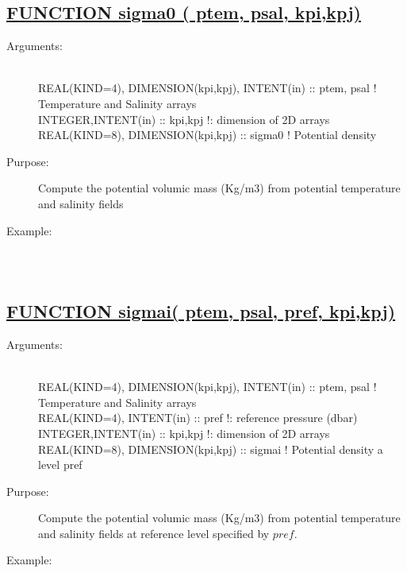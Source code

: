 \documentclass[a4paper,11pt]{article}
\begin{document}
\subsection*{\underline{FUNCTION sigma0 ( ptem, psal, kpi,kpj) }}
\begin{description}
\item[Arguments:] \ \\
       REAL(KIND=4), DIMENSION(kpi,kpj), INTENT(in) :: ptem, psal  ! Temperature and Salinity arrays \\
       INTEGER,INTENT(in) :: kpi,kpj  !: dimension of 2D arrays \\
       REAL(KIND=8), DIMENSION(kpi,kpj) :: sigma0    ! Potential density 
\item[Purpose:]   Compute the  potential volumic mass (Kg/m3) from potential temperature and
            salinity fields
\item[Example:]\ \\
\begin{verbatim}
\end{verbatim}
\end{description}

\subsection*{\underline{FUNCTION sigmai( ptem, psal, pref, kpi,kpj) }}
\begin{description}
\item[Arguments:] \ \\
       REAL(KIND=4), DIMENSION(kpi,kpj), INTENT(in) :: ptem, psal  ! Temperature and Salinity arrays \\
       REAL(KIND=4),                     INTENT(in) :: pref  !: reference pressure (dbar) \\
       INTEGER,INTENT(in) :: kpi,kpj  !: dimension of 2D arrays \\
       REAL(KIND=8), DIMENSION(kpi,kpj) :: sigmai    ! Potential density  a level pref
\item[Purpose:]   Compute the  potential volumic mass (Kg/m3) from potential temperature and
            salinity fields at reference level specified by $pref$.
\item[Example:]\ \\
\begin{verbatim}
\end{verbatim}
\end{description}
\end{document}
